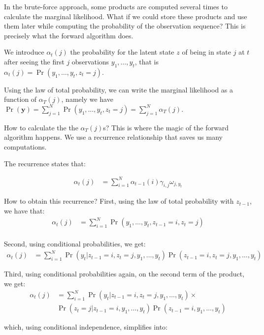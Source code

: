 \documentclass[
  12pt,
]{krantz}
\begin{document}
In the brute-force approach, some products are computed several times to calculate the marginal likelihood. What if we could store these products and use them later while computing the probability of the observation sequence? This is precisely what the forward algorithm does.

We introduce \(\alpha_t(j)\) the probability for the latent state \(z\) of being in state \(j\) at \(t\) after seeing the first \(j\) observations \(y_1, \ldots, y_t\), that is \(\alpha_t(j) = \Pr(y_1, \ldots, y_t, z_t = j)\).

Using the law of total probability, we can write the marginal likelihood as a function of \(\alpha_T(j)\), namely we have \(\Pr(\mathbf{y}) = \displaystyle{\sum_{j=1}^N\Pr(y_1, \ldots, y_t, z_t = j)} = \displaystyle{\sum_{j=1}^N\alpha_T(j)}\).

How to calculate the the \(\alpha_T(j)\)s? This is where the magic of the forward algorithm happens. We use a recurrence relationship that saves us many computations.

The recurrence states that:

\begin{align*}
\alpha_t(j) &= \sum_{i=1}^N \alpha_{t-1}(i) \gamma_{i,j} \omega_{j,y_t}
\end{align*}

How to obtain this recurrence? First, using the law of total probability with \(z_{t-1}\), we have that:
\begin{align*}
\alpha_t(j) &= \sum_{i=1}^N \Pr(y_1, \ldots, y_t, z_{t-1} = i, z_t = j)\\
\end{align*}

Second, using conditional probabilities, we get:
\begin{align*}
\alpha_t(j) &= \sum_{i=1}^N \Pr(y_t | z_{t-1} = i, z_t = j, y_1, \ldots, y_t) \Pr(z_{t-1} = i, z_t = j, y_1, \ldots, y_t)
\end{align*}

Third, using conditional probabilities again, on the second term of the product, we get:
\begin{align*}
\alpha_t(j) &= \sum_{i=1}^N \Pr(y_t | z_{t-1} = i, z_t = j, y_1, \ldots, y_t) \times \\ & \Pr(z_t = j | z_{t-1} = i, y_1, \ldots, y_t) \Pr(z_{t-1} = i, y_1, \ldots, y_t)
\end{align*}

which, using conditional independence, simplifies into:
\end{document}
